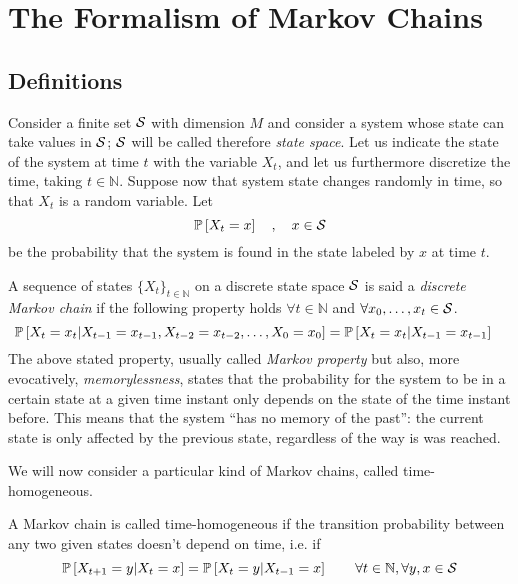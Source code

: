 \chapter{The Formalism of Markov Chains}
\label{ch:markov_chains}
\section{Definitions}
Consider a finite set $\mathcal{S}$ with dimension $M$ and consider a system whose state can take values in $\mathcal{S}$; $\mathcal{S}$ will be called therefore \emph{state space}. Let us indicate the state of the system at time $t$ with the variable $X_t$, and let us furthermore discretize the time, taking $t \in \mathbb{N}$. Suppose now that system state changes randomly in time, so that $X_t$ is a random variable. Let
\begin{equation}
    \mathbb{P}\left[X_t = x\right] \quad , \quad x \in \mathcal{S}
\end{equation}
be the probability that the system is found in the state labeled by $x$ at time $t$.

\begin{ndef}  \label{def:markov-chain}
    A sequence of states $\{X_t\}_{t\in \mathbb{N}}$ on a discrete state space $\mathcal{S}$ is said a \emph{discrete Markov chain} if the following property holds $\forall t \in \mathbb N$ and $\forall x_0, \dots, x_t \in \mathcal{S}$.
    \begin{equation}
        \mathbb{P}\left[ X_t = x_t | X_{t-1} = x_{t-1}, X_{t-2} = x_{t-2}, \dots, X_0 = x_0 \right] = \mathbb{P}\left[ X_t = x_t | X_{t-1} = x_{t-1} \right] \quad
    \end{equation}
The above stated property, usually called \emph{Markov property} but also, more evocatively, \emph{memorylessness}, states that the probability for the system to be in a certain state at a given time instant only depends on the state of the time instant before. This means that the system ``has no memory of the past'': the current state is only affected by the previous state, regardless of the way is was reached.
\end{ndef}

We will now consider a particular kind of Markov chains, called time-homogeneous.
\begin{ndef}  A Markov chain is called time-homogeneous if the transition probability between any two given states doesn't depend on time, i.e. if
    \begin{equation}
        \mathbb{P}\left[X_{t+1} = y | X_{t} = x\right] = \mathbb{P}\left[X_{t} = y | X_{t-1} = x\right] \quad \quad \forall t\in \mathbb{N}, \forall y, x \in \mathcal{S}
    \end{equation}
\end{ndef}

